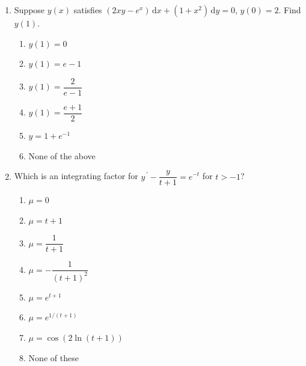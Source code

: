 \documentclass{ximera}
\newenvironment{mcenum}
{ \begin{enumerate}[itemsep=1em, topsep=1em, label=$\bigcirc$ (\alph*), align=left]
     }
{ \end{enumerate}                  }
\begin{document}
\begin{enumerate}[label=(\arabic*)]
\begin{mcenum}
\item $-2.5$
\item $-1.5$
\item $-0.5$
\item $0.5$
\item $1.5$
\item $2.5$ %
\end{mcenum}


\newpage

\item Suppose $y(x)$ satisfies $(2xy-e^x)\,\mathrm{d}x+(1+x^2)\,\mathrm{d}y=0$, $y(0)=2$.  Find $y(1)$.



	\begin{mcenum}
		\item[$\bigcirc$ (a)] $y(1)=0$
		\item[$\bigcirc$ (b)] $y(1)=e-1$
		\item[$\bigcirc$ (c)] $y(1)=\dfrac{2}{e-1}$
		\item[$\bigcirc$ (d)] $y(1)=\dfrac{e+1}{2}$  %
		\item[$\bigcirc$ (e)] $y=1+e^{-1}$
		\item[$\bigcirc$ (f)] None of the above
	\end{mcenum}



\item  Which is an integrating factor for $y^{\,\prime}-\dfrac{y}{t+1}=e^{-t}$ for $t>-1$?



	\begin{mcenum}
		\item $\mu=0$
		\item $\mu=t+1$
		\item $\mu=\dfrac{1}{t+1}$  %
		\item $\mu=-\dfrac{1}{(t+1)^2}$ 
        \item $\mu=e^{t+1}$
        \item $\mu=e^{1/(t+1)}$
		\item $\mu=\cos{(2\ln{(t+1)})}$
        \item None of these
	\end{mcenum}



\end{enumerate}
\end{document}
